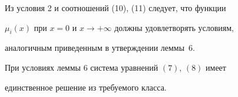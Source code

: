  


 


\begin{notenonum} 


Из условия 2 и соотношений (10), (11) следует, что функции 


$\mu_i(x)$ при $x=0$ и $x\to+\infty$ должны удовлетворять условиям, 


аналогичным приведенным в утверждении леммы~6. 


\end{notenonum} 


 


 


\begin{lem} 


При условиях леммы $6$ система уравнений $(7)$, $(8)$ имеет 


единственное решение из требуемого класса. 


\end{lem} 


 


 


